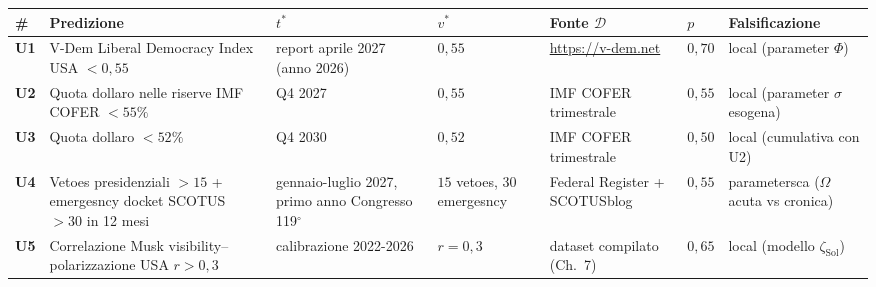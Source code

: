 {\def\LTcaptype{none} %
{\small\begin{longtable}[]{@{}
  >{\raggedright\arraybackslash}p{}
  >{\raggedright\arraybackslash}p{}
  >{\raggedright\arraybackslash}p{}
  >{\raggedright\arraybackslash}p{}
  >{\raggedright\arraybackslash}p{}
  >{\raggedright\arraybackslash}p{}
  >{\raggedright\arraybackslash}p{}@{}}
\toprule\noalign{}
\begin{minipage}[b]{\linewidth}\raggedright
\#
\end{minipage} & \begin{minipage}[b]{\linewidth}\raggedright
Predizione
\end{minipage} & \begin{minipage}[b]{\linewidth}\raggedright
\(t^*\)
\end{minipage} & \begin{minipage}[b]{\linewidth}\raggedright
\(v^*\)
\end{minipage} & \begin{minipage}[b]{\linewidth}\raggedright
Fonte \(\mathcal{D}\)
\end{minipage} & \begin{minipage}[b]{\linewidth}\raggedright
\(p\)
\end{minipage} & \begin{minipage}[b]{\linewidth}\raggedright
Falsificazione
\end{minipage} \\
\midrule\noalign{}
\endhead
\bottomrule\noalign{}
\endlastfoot
\textbf{U1} & V-Dem Liberal Democracy Index USA \(< 0{,}55\) & report
aprile 2027 (anno 2026) & \(0{,}55\) & \url{https://v-dem.net} &
\(0{,}70\) & local (parameter \(\Phi\)) \\
\textbf{U2} & Quota dollaro nelle riserve IMF COFER \(< 55\%\) & Q4 2027
& \(0{,}55\) & IMF COFER trimestrale & \(0{,}55\) & local (parameter
\(\sigma\) esogena) \\
\textbf{U3} & Quota dollaro \(< 52\%\) & Q4 2030 & \(0{,}52\) & IMF
COFER trimestrale & \(0{,}50\) & local (cumulativa con U2) \\
\textbf{U4} & Vetoes presidenziali \(> 15\) + emergesncy docket SCOTUS
\(> 30\) in 12 mesi & gennaio-luglio 2027, primo anno Congresso 119$^\circ$ &
\(15\) vetoes, \(30\) emergesncy & Federal Register + SCOTUSblog &
\(0{,}55\) & parametersca (\(\Omega\) acuta vs cronica) \\
\textbf{U5} & Correlazione Musk visibility--polarizzazione USA
\(r > 0{,}3\) & calibrazione 2022-2026 & \(r = 0{,}3\) & dataset
compilato (Ch.~7) & \(0{,}65\) & local (modello
\(\zeta_{\text{Sol}}\)) \\
\end{longtable}}
}

